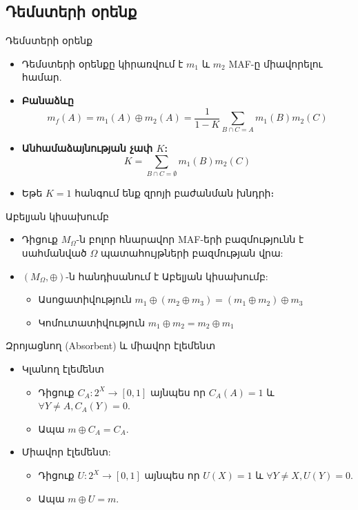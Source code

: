 \documentclass[aspectratio=169]{beamer}
\begin{document}
\subsection{Դեմստերի օրենք}
\begin{frame}{Դեմստերի օրենք}
\begin{itemize}
  \item Դեմստերի օրենքը կիրառվում է \(m_1\) և \(m_2\) {\rm MAF}-ը միավորելու համար.
  \item \textbf{Բանաձևը}
    \begin{equation*}
      m_f(A) = m_1(A) \oplus m_2(A) = \frac{1}{1 - K} \sum_{B \cap C = A} m_1(B) m_2(C)
    \end{equation*}
    \pause
  \item \textbf{Անհամաձայնության չափ \(K\):}
    \begin{equation*}
      K = \sum_{B \cap C = \emptyset} m_1(B) m_2(C)
    \end{equation*}
    \pause
  \item Եթե $K=1$ հանգում ենք զրոյի բաժանման խնդրի։
  \end{itemize}
\end{frame}

\begin{frame}{}
    \begin{block}{Աբելյան կիսախումբ}
\begin{itemize}
  \item Դիցուք \(M_{\Omega}\)-ն բոլոր հնարավոր {\rm MAF}-երի բազմությունն է սահմանված \(\Omega\) պատահույթների բազմության վրա: \pause
  \item \((M_{\Omega}, \oplus)\)-ն հանդիսանում է Աբելյան կիսախումբ: 
  \begin{itemize}
    \item Ասոցատիվություն \( m_1 \oplus (m_2 \oplus m_3) = (m_1 \oplus m_2) \oplus m_3 \)
    \item Կոմուտատիվություն \( m_1 \oplus m_2 = m_2 \oplus m_1 \)
  \end{itemize}
\end{itemize}
\end{block}
\pause
\begin{block}{Զրոյացնող ({\rm Absorbent}) և միավոր էլեմենտ}
\begin{itemize}
  \item Կլանող էլեմենտ
  \begin{itemize}
    \item Դիցուք \(C_A : 2^X \to [0, 1]\) այնպես որ \(C_A(A) = 1\) և \(\forall Y \neq A, C_A(Y) = 0\).
    \item Ապա \(m \oplus C_A = C_A\).
\pause
  \end{itemize}
  \item Միավոր էլեմենտ:
  \begin{itemize}
    \item Դիցուք \(U : 2^X \to [0, 1]\) այնպես որ \(U(X) = 1\) և \(\forall Y \neq X, U(Y) = 0\).
    \item Ապա \(m \oplus U = m\).
  \end{itemize}
\end{itemize}
\end{block}

\end{frame}
\end{document}
